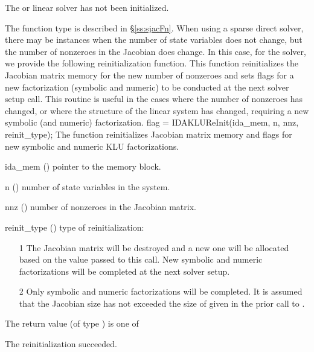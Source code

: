 {{\begin{args}
    The {\idaklu} or {\idasuperlumt} linear solver has not been initialized.
  \end{args}
}
{
  The function type  is described in \S\ref{ss:sjacFn}.
}
When using a sparse direct solver, there 
may be instances when the number of state variables does not 
change, but the number of nonzeroes in the Jacobian does change.  
In this case, for the {\idaklu} solver, we provide the following reinitialization
function.  This function reinitializes the Jacobian matrix
memory for the new number of nonzeroes and sets flags for a new factorization 
(symbolic and numeric) to be conducted at the next solver setup
call.  This routine is useful in the cases where the number of nonzeroes 
has changed, or where the structure of the linear system has changed,
requiring a new symbolic (and numeric) factorization.
{
  flag = IDAKLUReInit(ida\_mem, n, nnz, reinit\_type);
}
{
  The function  reinitializes Jacobian matrix memory and flags for
  new symbolic and numeric KLU factorizations.
}
{
  \begin{args}
  \item[ida\_mem] ()
    pointer to the {\ida} memory block.
  \item[n] ()
    number of state variables in the system.
  \item[nnz] ()
    number of nonzeroes in the Jacobian matrix.
  \item[reinit\_type] ()
    type of reinitialization:
    \begin{itemize}
    \item[1]  The Jacobian matrix will be destroyed and a new one will 
      be allocated based on the  value passed to this call. New symbolic and
      numeric factorizations will be completed at the next
      solver setup.
    \item[2]  Only symbolic and numeric factorizations will be completed.  
      It is assumed that the Jacobian size has not exceeded the size of 
       given in the prior call to {\idaklu}.
    \end{itemize}
  \end{args}
}
{
  The return value  (of type ) is one of
  \begin{args}
  \item[\Id{IDASLS\_SUCCESS}] 
    The reinitialization succeeded.
  \item[\Id{IDASLS\_MEM\_NULL}]

\end{args}}}
